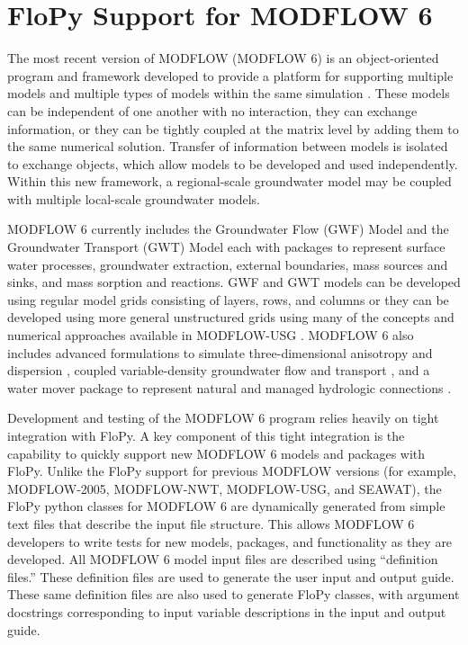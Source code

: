 \documentclass[11pt, oneside]{article}   	%
\begin{document}
\section{FloPy Support for MODFLOW 6}

The most recent version of MODFLOW (MODFLOW 6) is an object-oriented program and framework developed to provide a platform for supporting multiple models and multiple types of models within the same simulation \citep{modflow6gwf, modflow6framework, morway2021use}. These models can be independent of one another with no interaction, they can exchange information, or they can be tightly coupled at the matrix level by adding them to the same numerical solution. Transfer of information between models is isolated to exchange objects, which allow models to be developed and used independently. Within this new framework, a regional-scale groundwater model may be coupled with multiple local-scale groundwater models. 

MODFLOW 6 currently includes the Groundwater Flow (GWF) Model and the Groundwater Transport (GWT) Model each with packages to represent surface water processes,  groundwater extraction, external boundaries, mass sources and sinks, and mass sorption and reactions.  GWF and GWT models can be developed using regular model grids consisting of layers, rows, and columns or they can be developed using more general unstructured grids using many of the concepts and numerical approaches available in MODFLOW-USG  \citep{modflowusg}.  MODFLOW 6 also includes advanced formulations to simulate three-dimensional anisotropy and dispersion \citep{modflow6xt3d}, coupled variable-density groundwater flow and transport \citep{langevin2020hydraulic}, and a water mover package to represent natural and managed hydrologic connections \citep{morway2021use}.

Development and testing of the MODFLOW 6 program relies heavily on tight integration with FloPy.  A key component of this tight integration is the capability to quickly support new MODFLOW 6 models and packages with FloPy.  Unlike the FloPy support for previous MODFLOW versions (for example, MODFLOW-2005, MODFLOW-NWT, MODFLOW-USG, and SEAWAT), the FloPy python classes for MODFLOW 6 are dynamically generated from simple text files that describe the input file structure.  This allows MODFLOW 6 developers to write tests for new models, packages, and functionality as they are developed.  All MODFLOW 6 model input files are described using ``definition files.''  These definition files are used to generate the user input and output guide.  These same definition files are also used to generate FloPy classes, with argument docstrings corresponding to input variable descriptions in the input and output guide.
\end{document}

